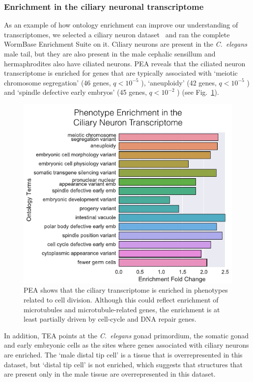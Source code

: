 \documentclass[10pt,letterpaper,twocolumn]{article}
\newcommand{\cel}{\emph{C.~elegans}}
\newcommand{\qval}[1]{
                      \ensuremath{
                                  q<10^{-#1}
                                  }
                      }
\begin{document}
\subsubsection*{Enrichment in the ciliary neuronal transcriptome}
As an example of how ontology enrichment can improve our understanding of
transcriptomes,
we selected a ciliary neuron dataset~\cite{Wang2015} and ran the complete WormBase
Enrichment Suite on it. Ciliary neurons are present in the \cel{} male tail, but
they are also present in the male cephalic sensillum and hermaphrodites also have
ciliated neurons. PEA reveals that the ciliated
neuron transcriptome is enriched for genes that are typically associated with
`meiotic chromosome segregation' (46 genes, \qval{5}),
`aneuploidy' (42 genes, \qval{5}) and `spindle defective early embryos' (45
genes, \qval{2}) (see Fig.~\ref{fig:cilia}).

\begin{figure}[htbp]
  \renewcommand{\familydefault}{\sfdefault}\normalfont{}
  \centering
  \includegraphics[width=\linewidth]{ciliary-transcriptome.pdf}
  \caption{PEA shows that the ciliary transcriptome is enriched in phenotypes
  related to cell division. Although this could reflect enrichment of
  microtubules and microtubule-related genes, the enrichment is at least
  partially driven by cell-cycle and DNA repair genes.}
\label{fig:cilia}
\end{figure}


In addition, TEA points at the \cel{} gonad primordium, the somatic gonad
and early embryonic cells as the sites where genes associated with ciliary neurons
are enriched. The `male distal tip cell' is a tissue
that is overrepresented in this dataset, but `distal tip cell' is not enriched,
which suggests that structures that are present only in the male tissue are
overrepresented in this dataset.
\end{document}
